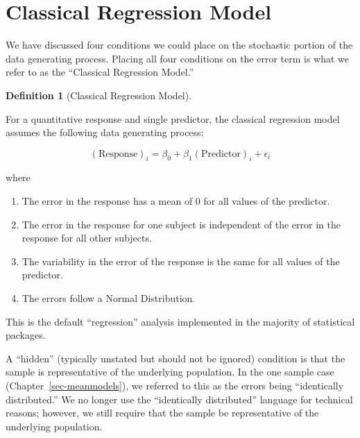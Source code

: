 \documentclass[
  letterpaper,
  DIV=11,
  numbers=noendperiod]{scrreprt}
\providecommand{\tightlist}{%
  \setlength{\itemsep}{0pt}\setlength{\parskip}{0pt}}\usepackage{longtable,booktabs,array}
\theoremstyle{definition}
\newtheorem{definition}{Definition}[chapter]
\theoremstyle{definition}
\theoremstyle{plain}
\theoremstyle{remark}
\begin{document}
\section{Classical Regression Model}\label{classical-regression-model}

We have discussed four conditions we could place on the stochastic
portion of the data generating process. Placing all four conditions on
the error term is what we refer to as the ``Classical Regression
Model.''

\begin{definition}[Classical Regression
Model]\protect\hypertarget{def-classical-regression}{}\label{def-classical-regression}

For a quantitative response and single predictor, the classical
regression model assumes the following data generating process:

\[(\text{Response})_i = \beta_0 + \beta_1 (\text{Predictor})_{i} + \epsilon_i\]

where

\begin{enumerate}
\def\labelenumi{\arabic{enumi}.}
\tightlist
\item
  The error in the response has a mean of 0 for all values of the
  predictor.
\item
  The error in the response for one subject is independent of the error
  in the response for all other subjects.
\item
  The variability in the error of the response is the same for all
  values of the predictor.
\item
  The errors follow a Normal Distribution.
\end{enumerate}

This is the default ``regression'' analysis implemented in the majority
of statistical packages.

\end{definition}

\begin{tcolorbox}[enhanced jigsaw, colbacktitle=quarto-callout-warning-color!10!white, colback=white, left=2mm, title=\textcolor{quarto-callout-warning-color}{\faExclamationTriangle}\hspace{0.5em}{Warning}, toptitle=1mm, leftrule=.75mm, breakable, bottomrule=.15mm, arc=.35mm, rightrule=.15mm, toprule=.15mm, coltitle=black, opacityback=0, colframe=quarto-callout-warning-color-frame, opacitybacktitle=0.6, bottomtitle=1mm, titlerule=0mm]

A ``hidden'' (typically unstated but should not be ignored) condition is
that the sample is representative of the underlying population. In the
one sample case (Chapter~\ref{sec-meanmodels}), we referred to this as
the errors being ``identically distributed.'' We no longer use the
``identically distributed'' language for technical reasons; however, we
still require that the sample be representative of the underlying
population.

\end{tcolorbox}
\end{document}
